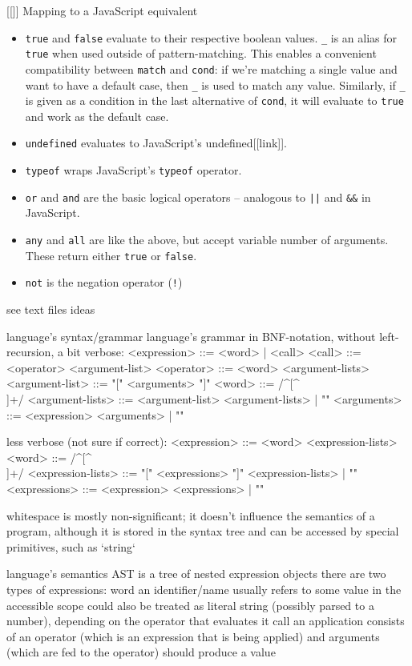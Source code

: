 [[]] Mapping to a JavaScript equivalent

\begin{itemize}
    \item \texttt{true} and \texttt{false} evaluate to their respective boolean values. \texttt{\_} is an alias for \texttt{true} when used outside of pattern-matching. This enables a convenient compatibility between \texttt{match} and \texttt{cond}: if we're matching a single value and want to have a default case, then \texttt{\_} is used to match any value. Similarly, if \texttt{\_} is given as a condition in the last alternative of \texttt{cond}, it will evaluate to \texttt{true} and work as the default case.
    \item \texttt{undefined} evaluates to JavaScript's undefined[[link]].
    \item \texttt{typeof} wraps JavaScript's \texttt{typeof} operator.
    \item \texttt{or} and \texttt{and} are the basic logical operators -- analogous to \texttt{||} and \texttt{\&\&} in JavaScript.
    \item \texttt{any} and \texttt{all} are like the above, but accept variable number of arguments. These return either \texttt{true} or \texttt{false}.
    \item \texttt{not} is the negation operator (\texttt{!})
\end{itemize}

see text files ideas

language's syntax/grammar
    language's grammar in BNF-notation, without left-recursion, a bit verbose:
    <expression>     ::= <word> | <call>
    <call>           ::= <operator> <argument-list>
    <operator>       ::= <word> <argument-lists>
    <argument-list>  ::= "[" <arguments> "]"
    <word>           ::= /^[^\s\[\]]+/
    <argument-lists> ::= <argument-list> <argument-lists> | ""
    <arguments>      ::= <expression> <arguments> | ""

    less verbose (not sure if correct):
    <expression>       ::= <word> <expression-lists>
    <word>           ::= /^[^\s\[\]]+/
    <expression-lists> ::= "[" <expressions> "]" <expression-lists> | ""
    <expressions>      ::= <expression> <expressions> | ""

    whitespace is mostly non-significant;
    it doesn't influence the semantics of a program, although it is stored in the syntax tree and can be accessed by special primitives, such as `string`

language's semantics
    AST is a tree of nested expression objects
    there are two types of expressions:
        word
            an identifier/name
            usually refers to some value in the accessible scope
            could also be treated as literal string (possibly parsed to a number), depending on the operator that evaluates it
        call
            an application
            consists of an operator (which is an expression that is being applied) and arguments (which are fed to the operator)
            should produce a value

